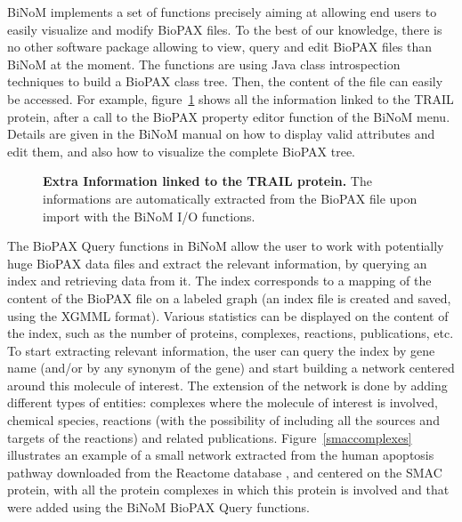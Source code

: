 \documentclass[10pt]{bmc_article}
\newenvironment{bmcformat}{\baselineskip20pt\sloppy\setboolean{publ}{false}}{\baselineskip20pt\sloppy}
\begin{document}
\begin{bmcformat}
BiNoM implements a set of functions precisely aiming at allowing end users to
easily visualize and modify BioPAX files. To the best of our knowledge, there is
no other software package allowing to view, query and edit BioPAX files than
BiNoM at the moment. The functions are using
Java class introspection techniques to build a BioPAX class tree. Then, the
content of the file can easily be accessed. For example, figure~\ref{biopaxtrailprop} shows
all the information linked to the TRAIL protein, after a call to the
BioPAX property
editor function of the BiNoM menu. Details are given in the BiNoM manual on how
to display valid attributes and edit them, and also how to visualize the
complete BioPAX tree.


\begin{figure}[h]
 \caption{\label{biopaxtrailprop}  \textbf{Extra Information linked to the TRAIL protein.}
      The informations are automatically extracted from the BioPAX file upon
import with the BiNoM I/O functions.}
\end{figure}


The BioPAX Query functions in BiNoM allow the user to work with potentially huge
BioPAX data files and extract the relevant information, by querying an index and
retrieving data from it. The index corresponds to a mapping of the content of
the BioPAX file on a labeled graph (an index file is created and saved, using
the XGMML format). Various statistics can be displayed on the content of the
index, such as the number of proteins, complexes, reactions, publications, etc.
To start extracting relevant information, the user can query the index by gene
name (and/or by any synonym of the gene) and start building a network centered
around this molecule of interest. The extension of the network is done by adding
different types of entities: complexes where the molecule of interest is
involved, chemical species, reactions (with the possibility of including all the
sources and targets of the reactions) and related publications. Figure~\ref{smaccomplexes}
illustrates an example of a small network extracted from the human apoptosis
pathway downloaded from the Reactome database \cite{joshi2005reactome}, and
centered on the SMAC protein, with all the protein complexes in which
this protein is involved and that were added using the BiNoM BioPAX Query functions.



\end{bmcformat}
\end{document}
